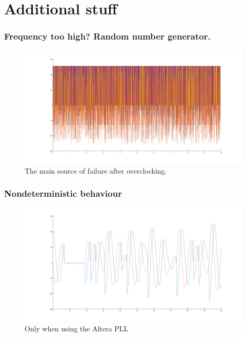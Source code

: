 \documentclass{beamer}[10]
\begin{document}
\section*{Additional stuff}
\begin{frame}
	\frametitle{Frequency too high? Random number generator.}
	\begin{figure}
		\centering
		\includegraphics[width=\columnwidth]{figs/frequency_too_high_RNG}
		\caption{The main source of failure after overclocking.}
	\end{figure}
\end{frame}
\begin{frame}
	\frametitle{Nondeterministic behaviour}
	\begin{figure}
		\centering
		\includegraphics[width=\columnwidth]{figs/nondet}
		\caption{Only when using the Altera PLL}
	\end{figure}
\end{frame}
\end{document}
